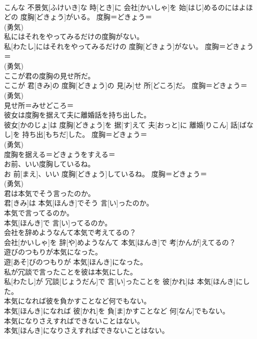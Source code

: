 \documentclass[8pt]{extreport}
\begin{document}
\begin{CJK}{UTF8}{min}
{\\	こんな 不景気[ふけいき]な 時[とき]に 会社[かいしゃ]を 始[はじ]めるのにはよほどの 度胸[どきょう]がいる。	度胸＝どきょう＝ 
\\	(勇気) 
\\	私にはそれをやってみるだけの度胸がない。	
\\	私[わたし]にはそれをやってみるだけの 度胸[どきょう]がない。	度胸＝どきょう＝ 
\\	(勇気) 
\\	ここが君の度胸の見せ所だ。	
\\	ここが 君[きみ]の 度胸[どきょう]の 見[み]せ 所[どころ]だ。	度胸＝どきょう＝ 
\\	(勇気) 
\\	見せ所＝みせどころ＝ 
\\	彼女は度胸を据えて夫に離婚話を持ち出した。	
\\	彼女[かのじょ]は 度胸[どきょう]を 据[す]えて 夫[おっと]に 離婚[りこん] 話[ばなし]を 持ち出[もちだ]した。	度胸＝どきょう＝ 
\\	(勇気) 
\\	度胸を据える＝どきょうをすえる＝ 
\\	お前、いい度胸しているね。	
\\	お 前[まえ]、いい 度胸[どきょう]しているね。	度胸＝どきょう＝ 
\\	(勇気) 
\\	君は本気でそう言ったのか。	
\\	君[きみ]は 本気[ほんき]でそう 言[い]ったのか。	
\\	本気で言ってるのか。	
\\	本気[ほんき]で 言[い]ってるのか。	
\\	会社を辞めようなんて本気で考えてるの？	
\\	会社[かいしゃ]を 辞[や]めようなんて 本気[ほんき]で 考[かんが]えてるの？	
\\	遊びのつもりが本気になった。	
\\	遊[あそ]びのつもりが 本気[ほんき]になった。	
\\	私が冗談で言ったことを彼は本気にした。	
\\	私[わたし]が 冗談[じょうだん]で 言[い]ったことを 彼[かれ]は 本気[ほんき]にした。	
\\	本気になれば彼を負かすことなど何でもない。	
\\	本気[ほんき]になれば 彼[かれ]を 負[ま]かすことなど 何[なん]でもない。	
\\	本気になりさえすればできないことはない。	
\\	本気[ほんき]になりさえすればできないことはない。	
}
\end{CJK}
\end{document}
